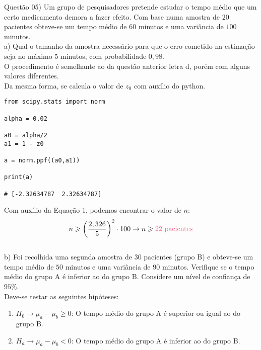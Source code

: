 
\noindent \textcolor{COLOR1}{Questão 05)} Um grupo de pesquisadores pretende estudar o tempo médio que um certo medicamento demora a fazer efeito. Com base numa amostra de $20$ pacientes obteve-se um tempo médio de $60$ minutos e uma variância de $100$ minutos.
\\

a) Qual o tamanho da amostra necessário para que o erro cometido na estimação seja no máximo $5$ minutos, com probabilidade $0,98$.
\\

O procedimento é semelhante ao da questão anterior letra d, porém com alguns valores diferentes.\\

Da mesma forma, se calcula o valor de $z_0$ com auxílio do python.\\

\begin{lstlisting}
from scipy.stats import norm
        
alpha = 0.02
                
a0 = alpha/2
a1 = 1 - z0
        
a = norm.ppf((a0,a1))
                
print(a)
        
# [-2.32634787  2.32634787]
\end{lstlisting}

Com auxílio da Equação 1, podemos encontrar o valor de $n$:
\\

\[
    n\geqslant \biggl(\frac{2,326}{5}\biggr)^2 \cdot 100 \to n\geqslant \textcolor{COLOR2}{22\ \text{pacientes}}
\]
\\

b) Foi recolhida uma segunda amostra de $30$ pacientes (grupo B) e obteve-se um tempo médio de $50$ minutos e uma variância de $90$ minutos. Verifique se o tempo médio do grupo A é inferior ao do grupo B. Considere um nível de confiança de $95\%$.
\\

Deve-se testar as seguintes hipóteses:

\begin{enumerate}
    \item $H_0\to \mu_a - \mu_b\geqslant 0$: O tempo médio do grupo A é superior ou igual ao do grupo B.
    \item $H_a\to \mu_a - \mu_b< 0$: O tempo médio do grupo A é inferior ao do grupo B.
\end{enumerate}

